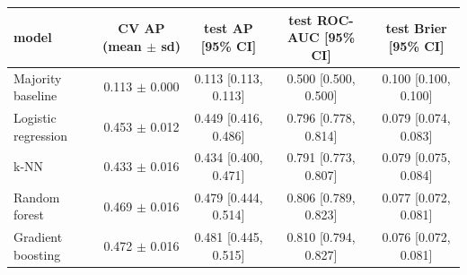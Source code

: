 \begin{tabular}{lcccc}
\toprule
model & CV AP (mean $\pm$ sd) & test AP [95\% CI] & test ROC-AUC [95\% CI] & test Brier [95\% CI] \\
\midrule
Majority baseline & 0.113 $\pm$ 0.000 & 0.113 [0.113, 0.113] & 0.500 [0.500, 0.500] & 0.100 [0.100, 0.100] \\
Logistic regression & 0.453 $\pm$ 0.012 & 0.449 [0.416, 0.486] & 0.796 [0.778, 0.814] & 0.079 [0.074, 0.083] \\
k-NN & 0.433 $\pm$ 0.016 & 0.434 [0.400, 0.471] & 0.791 [0.773, 0.807] & 0.079 [0.075, 0.084] \\
Random forest & 0.469 $\pm$ 0.016 & 0.479 [0.444, 0.514] & 0.806 [0.789, 0.823] & 0.077 [0.072, 0.081] \\
Gradient boosting & 0.472 $\pm$ 0.016 & 0.481 [0.445, 0.515] & 0.810 [0.794, 0.827] & 0.076 [0.072, 0.081] \\
\bottomrule
\end{tabular}